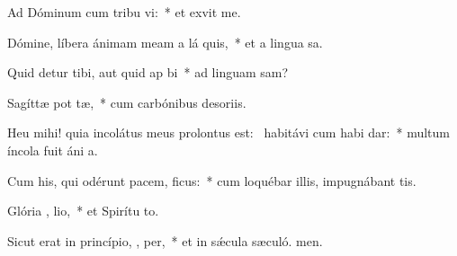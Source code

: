 \item Ad Dóminum cum tribu vi:~* et exvit me.
\item Dómine, líbera ánimam meam a lá quis,~* et a lingua sa.
\item Quid detur tibi, aut quid ap bi~* ad linguam sam?
\item Sagíttæ pot tæ,~* cum carbónibus desoriis.
\item Heu mihi! quia incolátus meus prolontus est:~\pscross{} habitávi cum habi dar:~* multum íncola fuit áni a.
\item Cum his, qui odérunt pacem,  ficus:~* cum loquébar illis, impugnábant  tis.
\item Glória ,  lio,~* et Spirítu to.
\item Sicut erat in princípio,  ,  per,~* et in sǽcula sæculó. men.
